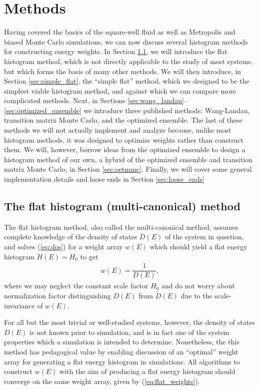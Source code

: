 \documentclass[11pt]{article}
\newcommand{\f}[2]{\dfrac{#1}{#2}} %
\newcommand{\p}[1]{\left(#1\right)} %
\begin{document}
\section{Methods}
\label{sec:methods}

Having covered the basics of the square-well fluid as well as
Metropolis and biased Monte Carlo simulations, we can now discuss
several histogram methods for constructing energy weights. In Section
\ref{sec:flat_histogram}, we will introduce the flat histogram method,
which is not directly applicable to the study of most systems, but
which forms the basis of many other methods. We will then introduce,
in Section \ref{sec:simple_flat}, the ``simple flat'' method, which we
designed to be the simplest viable histogram method, and against which
we can compare more complicated methods. Next, in Sections
\ref{sec:wang_landau}--\ref{sec:optimized_ensemble} we introduce three
published methods: Wang-Landau, transition matrix Monte Carlo, and the
optimized ensemble. The last of these methods we will not actually
implement and analyze because, unlike most histogram methods, it was
designed to optimize weights rather than construct them. We will,
however, borrow ideas from the optimized ensemble to design a
histogram method of our own, a hybrid of the optimized ensemble and
transition matrix Monte Carlo, in Section \ref{sec:oetmmc}. Finally,
we will cover some general implementation details and loose ends in
Section \ref{sec:loose_ends}

\subsection{The flat histogram (multi-canonical) method}
\label{sec:flat_histogram}

The flat histogram method, also called the multi-canonical method,
assumes complete knowledge of the density of states $D\p{E}$ of the
system in question, and solves (\ref{eq:dos}) for a weight array
$w\p{E}$ which should yield a flat energy histogram $H\p E=H_0$ to get
\begin{align}
  w\p E=\f1{D\p E},
  \label{eq:flat_weights}
\end{align}
where we may neglect the constant scale factor $H_0$ and do not worry
about normalization factor distinguishing $D\p{E}$ from $\tilde
D\p{E}$ due to the scale-invariance of $w\p{E}$.

For all but the most trivial or well-studied systems, however, the
density of states $D\p{E}$ is not known prior to simulation, and is in
fact one of the system properties which a simulation is intended to
determine. Nonetheless, the this method has pedagogical value by
enabling discussion of an ``optimal'' weight array for generating a
flat energy histogram in simulations. All algorithms to construct
$w\p{E}$ with the aim of producing a flat energy histogram should
converge on the same weight array, given by (\ref{eq:flat_weights}).
\end{document}
